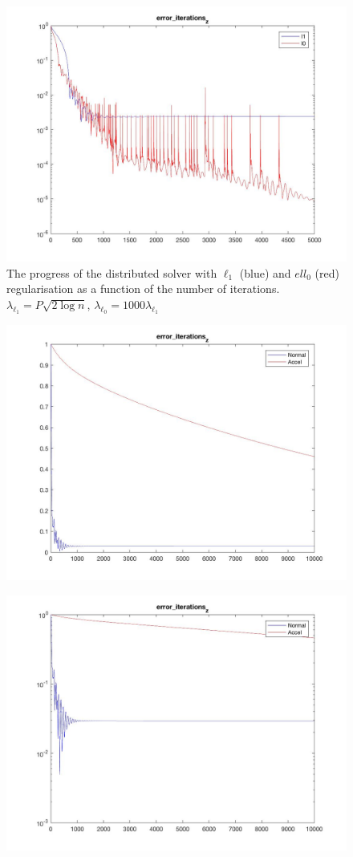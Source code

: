 \begin{figure}[h]
\centering
\includegraphics[height = 7.3 cm]{l1vsl0-long.jpg}
\caption{The progress of the distributed solver with \(\ell_1\) (blue) and \(ell_0\) (red) regularisation as a function of the number of iterations. \(\lambda_{\ell_1} = P\sqrt{2\log{n}}\),  \(\lambda_{\ell_0} = 1000\lambda_{\ell_1}\) }
\label{ch5:fig:l1l0-long}
\end{figure}

\begin{figure}[h]
\centering
\includegraphics[height = 7.3 cm]{dlm-iterations.jpg}
\caption{}
\label{ch5:dlm1}
\end{figure}

\begin{figure}[h]
\centering
\includegraphics[height = 7.3 cm]{dlm-iterations-log.jpg}
\caption{}
\label{ch5:dlm2}
\end{figure}

